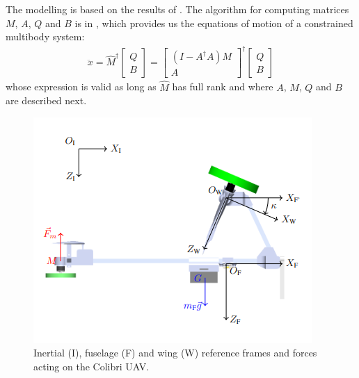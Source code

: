 The modelling is based on the results of \cite[Section 2.15]{udwadia-phohomsiri}. The algorithm for computing matrices $M$, $A$, $Q$ and $B$ is in \cite{udwadia-schutte}, which provides us the equations of motion of a constrained multibody system: 
\begin{align}
\label{eq:udwadia}
    \ddot{x} = \hat{M}^{\dag} \begin{bmatrix} Q \\ B \end{bmatrix}  = \begin{bmatrix} (I - A^{\dag}A)M \\ A \end{bmatrix}^{\dag} \begin{bmatrix} Q \\ B \end{bmatrix}
\end{align}
whose expression is valid as long as $\hat{M}$ has full rank and where $A$, $M$, $Q$ and $B$ are described next.\\
\begin{figure}[h]
\centering
    \includegraphics[width=1\columnwidth,angle=0,trim={0 0 0 0.5cm},clip]{figures/fram_side_colibri.png}
    \caption{Inertial (I), fuselage (F) and wing (W) reference frames and forces acting on the Colibri UAV.}
    \label{fig:colibri_frame_side}
\end{figure}
